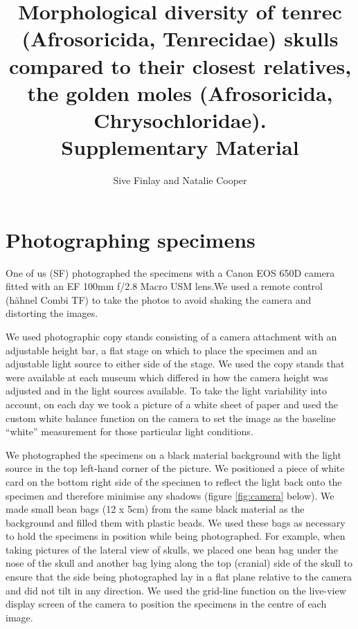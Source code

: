 \documentclass[12pt,a4paper]{article}
\begin{document}
\title{
       Morphological diversity of tenrec (Afrosoricida, Tenrecidae) skulls compared to their closest relatives, the golden moles (Afrosoricida, Chrysochloridae).\\
       \bigskip
       Supplementary Material }
\author{Sive Finlay and Natalie Cooper}
\date{}
\maketitle





\section{Photographing specimens}
One of us (SF) photographed the specimens with a Canon EOS 650D camera fitted with an EF 100mm f/2.8 Macro USM lens.We used a remote control (h\"ahnel Combi TF) to take the photos to avoid shaking the camera and distorting the images.

We used photographic copy stands consisting of a camera attachment with an adjustable height bar, a flat stage on which to place the specimen and an adjustable light source to either side of the stage. We used the copy stands that were available at each museum which differed in how the camera height was adjusted and in the light sources available.
To take the light variability into account, on each day we took a picture of a white sheet of paper and used the custom white balance function on the camera to set the image as the baseline “white” measurement for those particular light conditions.

We photographed the specimens on a black material background with the light source in the top left-hand corner of the picture. We positioned a piece of white card on the bottom right side of the specimen to reflect the light back onto the specimen and therefore minimise any shadows (figure \ref{fig:camera} below).
We made small bean bags (12 x 5cm) from the same black material as the background and filled them with plastic beads. We used these bags as necessary to hold the specimens in position while being photographed. For example, when taking pictures of the lateral view of skulls, we placed one bean bag under the nose of the skull and another bag lying along the top (cranial) side of the skull to ensure that the side being photographed lay in a flat plane relative to the camera and did not tilt in any direction. 
We used the grid-line function on the live-view display screen of the camera to position the specimens in the centre of each image. 
\end{document}
